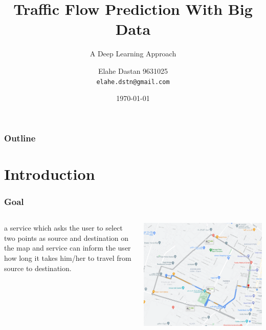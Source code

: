 \documentclass{beamer}
\author[Elahe Dastan]{%
  Elahe Dastan\hfill
  9631025\\
  \texttt{elahe.dstn@gmail.com}
}
\title{Traffic Flow Prediction With Big Data}
\subtitle{A Deep Learning Approach}
\institute[AUT]{Machine Learning\\Amirkabir University of Technology}
\date{\minimaldate\today}
\begin{document}
\begin{frame}
  \titlepage{}
\end{frame}
\begin{frame}
	\frametitle{Outline}
	\tableofcontents{}
\end{frame}

\section{Introduction}

\begin{frame}
	\frametitle{Goal}
	\begin{columns}[t]
			\begin{definition}
				a service which asks the user to select two points as source and destination on the map and
				service can inform the user \alert{how long it takes} him/her to travel from source to destination.
			\end{definition}
		\pause
			\includegraphics[height=0.5\textheight]{./img/intro.png}
	\end{columns}
\end{frame}
\end{document}
